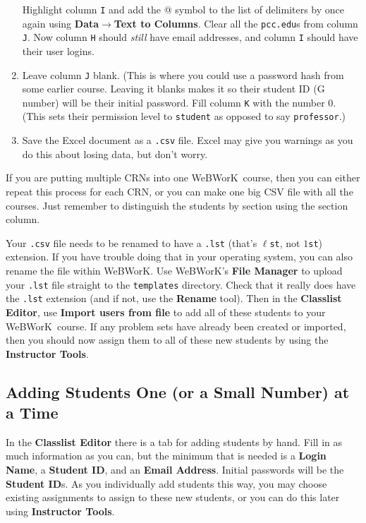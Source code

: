 \documentclass[12pt]{article}
\newcommand{\menu}[1]{\textbf{#1}}
\newcommand{\WW}{WeBWorK}
\begin{document}
\begin{enumerate}
	      Highlight column \texttt{I} and add the @ symbol to the list of delimiters by once again using \menu{Data}$\rightarrow$\menu{Text to Columns}.
	      Clear all the \texttt{pcc.edu}s from column \texttt{J}.
	      Now column \texttt{H} should \emph{still} have email addresses, and column \texttt{I} should have their user logins.
	\item Leave column \texttt{J} blank.
	      (This is where you could use a password hash from some earlier course.
	      Leaving it blanks makes it so their student ID (G number) will be their initial password.
	      Fill column \texttt{K} with the number 0.
	      (This sets their permission level to \texttt{student} as opposed to say \texttt{professor}.)
	\item Save the Excel document as a \texttt{.csv} file.
	      Excel may give you warnings as you do this about losing data, but don't worry.
\end{enumerate}

If you are putting multiple CRNs into one \WW\ course, then you can either repeat this process for each CRN, or you can make one big CSV file with all the courses.
Just remember to distinguish the students by section using the section column.

Your \texttt{.csv} file needs to be renamed to have a \texttt{.lst} (that's $\ell$\texttt{st}, not $1$\texttt{st}) extension.
If you have trouble doing that in your operating system, you can also rename the file within \WW.
Use \WW's \menu{File Manager} to upload your \texttt{.lst} file straight to the \texttt{templates} directory.
Check that it really does have the \texttt{.lst} extension (and if not, use the \menu{Rename} tool).
Then in the \menu{Classlist Editor}, use \menu{Import users from file} to add all of these students to your \WW\ course.
If any problem sets have already been created or imported, then you should now assign them to all of these new students by using the \menu{Instructor Tools}.

\subsection{Adding Students One (or a Small Number) at a Time}
In the \menu{Classlist Editor} there is a tab for adding students by hand.
Fill in as much information as you can, but the minimum that is needed is a \menu{Login Name}, a \menu{Student ID}, and an \menu{Email Address}.
Initial passwords will be the \menu{Student ID}s.
As you individually add students this way, you may choose existing assignments to assign to these new students, or you can do this later using \menu{Instructor Tools}.
\end{document}
